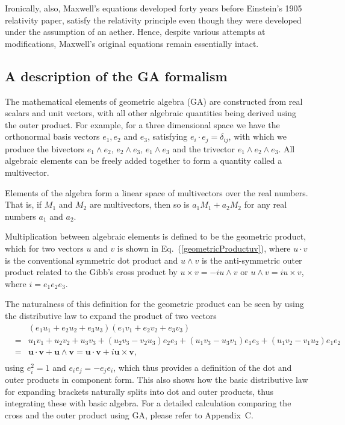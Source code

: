 \documentclass[12pt,aps,prb,preprint]{revtex4}   %
\newcommand{\bea}{\begin{eqnarray}}
\newcommand{\eea}{\end{eqnarray}}
\newcommand{\iGA}{{i}}
\begin{document}
Ironically, also, Maxwell's equations developed forty years before Einstein's 1905 relativity paper, satisfy the relativity principle even though they were developed under the assumption of an aether.
Hence, despite various attempts at modifications, Maxwell's original equations remain essentially intact.

\subsection{A description of the GA formalism}

The mathematical elements of geometric algebra (GA) are constructed from real scalars and unit vectors, with all other algebraic quantities being derived using the outer product.
For example, for a three dimensional space we have the orthonormal basis vectors $ e_1, e_2 $ and $ e_3 $, satisfying $ e_{i} \cdot e_{j}=\delta _{ij} $, with which we produce the bivectors  $ e_1 \wedge e_2 $, $ e_2 \wedge e_3 $, $ e_1 \wedge e_3 $ and the trivector  $  e_1 \wedge e_2 \wedge e_3$. All algebraic elements can be freely added together to form a quantity called a multivector.

Elements of the algebra form a linear space of multivectors over the real numbers.
That is, if  $ M_1 $ and $ M_2 $ are multivectors, then so is  $ a_1 M_1 + a_2 M_2 $	for any real numbers $ a_1 $  and $ a_2 $. 

Multiplication between algebraic elements is defined to be the geometric product, which for two vectors $ u $ and $ v $ is shown in Eq.~(\ref{geometricProductuv}), where $u \cdot v$ is the conventional symmetric dot product and $%
u \wedge v $ is the anti-symmetric outer product related to the Gibb's cross product by $%
u \times v=-\iGA u \wedge v $ or $ u \wedge v = \iGA u \times v $, where $\iGA =e_{1}e_{2}e_{3}$. 

The naturalness of this definition for the geometric product can be seen by using the distributive law to expand the product of two vectors
\bea \label{VectorProductExpand}
& & (e_1 u_1 + e_2 u_2 + e_3 u_3 ) ( e_1 v_1 + e_2 v_2 + e_3 v_3 ) \\ \nonumber
& = & u_1 v_1 + u_2 v_2 + u_3 v_3 + (u_2 v_3 - v_2 u_3 ) e_2 e_3 + (u_1 v_3 - u_3 v_1 ) e_1 e_3 + (u_1 v_2 - v_1 u_2 ) e_1 e_2 \\ \nonumber
& = & \textbf{u} \cdot \textbf{v}  + \textbf{u} \wedge \textbf{v}  = \textbf{u} \cdot \textbf{v}  + i \textbf{u} \times \textbf{v}, \\ \nonumber
\eea
using $ e_i^2 = 1 $ and $ e_i e_j = - e_j e_i $, which thus provides a definition of the dot and outer products in component form. This also shows how the basic distributive law for expanding brackets naturally splits into dot and outer products, thus integrating these with basic algebra. For a detailed calculation comparing the cross and the outer product using GA, please refer to Appendix~C. 
\end{document}
